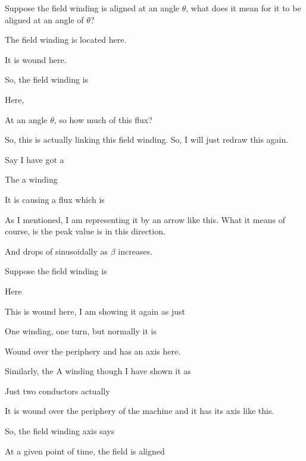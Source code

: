\documentclass{article}
\begin{document}






Suppose the field winding is aligned at an angle $\theta$, what does it mean for it to be aligned at an angle of $\theta$?

The field winding is located here.

It is wound here.

So, the field winding is

Here,

At an angle $\theta$, so how much of this flux?

So, this is actually linking this field winding. So, I will just redraw this again.

Say I have got a

The a winding

It is causing a flux which is

As I mentioned, I am representing it by an arrow like this. What it means of course, is the peak value is in this direction.

And drops of sinusoidally as $\beta$ increases.

Suppose the field winding is

Here









This is wound here, I am showing it again as just

One winding, one turn, but normally it is

Wound over the periphery and has an axis here.

Similarly, the A winding though I have shown it as

Just two conductors actually

It is wound over the periphery of the machine and it has its axis like this.

So, the field winding axis says

At a given point of time, the field is aligned
\end{document}
